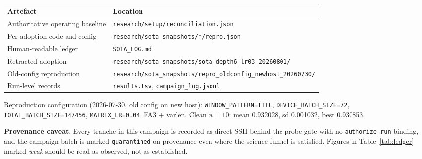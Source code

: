 \documentclass[11pt,a4paper]{article}
\begin{document}
\begin{table}[h]
\centering
\small
\begin{tabular}{@{}ll@{}}
\toprule
\textbf{Artefact} & \textbf{Location} \\
\midrule
Authoritative operating baseline & \texttt{research/setup/reconciliation.json} \\
Per-adoption code and config     & \texttt{research/sota\_snapshots/*/repro.json} \\
Human-readable ledger            & \texttt{SOTA\_LOG.md} \\
Retracted adoption               & \texttt{research/sota\_snapshots/sota\_depth6\_lr03\_20260801/} \\
Old-config reproduction          & \texttt{research/sota\_snapshots/repro\_oldconfig\_newhost\_20260730/} \\
Run-level records                & \texttt{results.tsv}, \texttt{campaign\_log.jsonl} \\
\bottomrule
\end{tabular}
\end{table}

\noindent
Reproduction configuration (2026-07-30, old config on new host):
\texttt{WINDOW\_PATTERN=TTTL}, \texttt{DEVICE\_BATCH\_SIZE=72},
\texttt{TOTAL\_BATCH\_SIZE=147456}, \texttt{MATRIX\_LR=0.04}, FA3 + varlen.
Clean $n=10$: mean \num{0.932028}, sd \num{0.001032}, best \num{0.930853}.

\vspace{1em}
\noindent
\textbf{Provenance caveat.} Every tranche in this campaign is recorded as direct-SSH behind
the probe gate with no \texttt{authorize-run} binding, and the campaign batch is marked
\texttt{quarantined} on provenance even where the science funnel is satisfied. Figures in
Table~\ref{tab:ledger} marked \emph{weak} should be read as observed, not as established.
\end{document}
